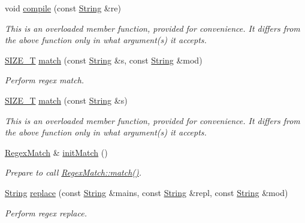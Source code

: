 \begin{DoxyCompactItemize}
void \hyperlink{classjpcre2_1_1Regex_a81687ca434654cae776c2854c3618de0}{compile} (const \hyperlink{namespacejpcre2_a91f03070152fb228bc116c5a737f1d16}{String} \&re)
\begin{DoxyCompactList}\small\item\em This is an overloaded member function, provided for convenience. It differs from the above function only in what argument(s) it accepts. \end{DoxyCompactList}\item 
\hyperlink{namespacejpcre2_a2aac465ddcb123560c7c8215dd69246c}{S\+I\+Z\+E\+\_\+T} \hyperlink{classjpcre2_1_1Regex_ab93775a93a0a537d09b9e9ab4a5a3894}{match} (const \hyperlink{namespacejpcre2_a91f03070152fb228bc116c5a737f1d16}{String} \&s, const \hyperlink{namespacejpcre2_a91f03070152fb228bc116c5a737f1d16}{String} \&mod)
\begin{DoxyCompactList}\small\item\em Perform regex match. \end{DoxyCompactList}\item 
\hyperlink{namespacejpcre2_a2aac465ddcb123560c7c8215dd69246c}{S\+I\+Z\+E\+\_\+T} \hyperlink{classjpcre2_1_1Regex_a9ffbb6aa54cb97125f1b4211bc1d09a5}{match} (const \hyperlink{namespacejpcre2_a91f03070152fb228bc116c5a737f1d16}{String} \&s)
\begin{DoxyCompactList}\small\item\em This is an overloaded member function, provided for convenience. It differs from the above function only in what argument(s) it accepts. \end{DoxyCompactList}\item 
\hyperlink{classjpcre2_1_1RegexMatch}{Regex\+Match} \& \hyperlink{classjpcre2_1_1Regex_a519b0915bf1163c6ce6a4d674b30cfcd}{init\+Match} ()
\begin{DoxyCompactList}\small\item\em Prepare to call \hyperlink{classjpcre2_1_1RegexMatch_a5868aef3a146594ea1ebef34d122bb33}{Regex\+Match\+::match()}. \end{DoxyCompactList}\item 
\hyperlink{namespacejpcre2_a91f03070152fb228bc116c5a737f1d16}{String} \hyperlink{classjpcre2_1_1Regex_ac592ce7a5e4210ed5f90a0105b1f2981}{replace} (const \hyperlink{namespacejpcre2_a91f03070152fb228bc116c5a737f1d16}{String} \&mains, const \hyperlink{namespacejpcre2_a91f03070152fb228bc116c5a737f1d16}{String} \&repl, const \hyperlink{namespacejpcre2_a91f03070152fb228bc116c5a737f1d16}{String} \&mod)
\begin{DoxyCompactList}\small\item\em Perform regex replace. \end{DoxyCompactList}\item 

\end{DoxyCompactItemize}
